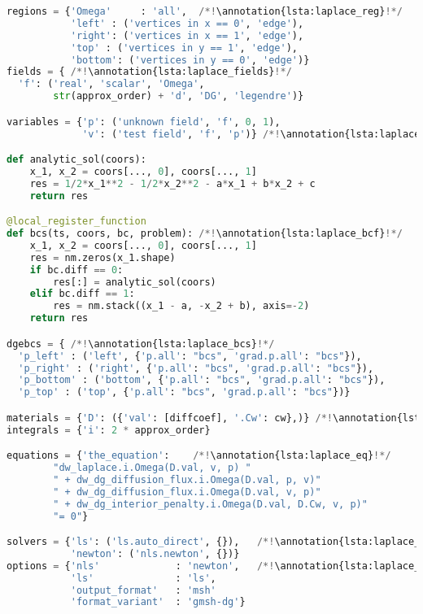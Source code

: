 \setcounter{lstannotation}{0}
\begin{lstlisting}[language=Python, caption=\pysauce{example\_dg\_laplace.py}, 
label={lst:laplace}]
regions = {'Omega'     : 'all',  /*!\annotation{lsta:laplace_reg}!*/
		   'left' : ('vertices in x == 0', 'edge'),
		   'right': ('vertices in x == 1', 'edge'),
		   'top' : ('vertices in y == 1', 'edge'),
		   'bottom': ('vertices in y == 0', 'edge')}
fields = { /*!\annotation{lsta:laplace_fields}!*/
  'f': ('real', 'scalar', 'Omega', 
        str(approx_order) + 'd', 'DG', 'legendre')}

variables = {'p': ('unknown field', 'f', 0, 1),
			 'v': ('test field', 'f', 'p')} /*!\annotation{lsta:laplace_vars}!*/

def analytic_sol(coors): 
	x_1, x_2 = coors[..., 0], coors[..., 1]
	res = 1/2*x_1**2 - 1/2*x_2**2 - a*x_1 + b*x_2 + c
	return res

@local_register_function
def bcs(ts, coors, bc, problem): /*!\annotation{lsta:laplace_bcf}!*/
	x_1, x_2 = coors[..., 0], coors[..., 1]
	res = nm.zeros(x_1.shape)
	if bc.diff == 0:
		res[:] = analytic_sol(coors)
	elif bc.diff == 1:
		res = nm.stack((x_1 - a, -x_2 + b), axis=-2)
	return res

dgebcs = { /*!\annotation{lsta:laplace_bcs}!*/
  'p_left' : ('left', {'p.all': "bcs", 'grad.p.all': "bcs"}),
  'p_right' : ('right', {'p.all': "bcs", 'grad.p.all': "bcs"}),
  'p_bottom' : ('bottom', {'p.all': "bcs", 'grad.p.all': "bcs"}),
  'p_top' : ('top', {'p.all': "bcs", 'grad.p.all': "bcs"})}

materials = {'D': ({'val': [diffcoef], '.Cw': cw},)} /*!\annotation{lsta:laplace_mat}!*/
integrals = {'i': 2 * approx_order}

equations = {'the_equation':    /*!\annotation{lsta:laplace_eq}!*/
		"dw_laplace.i.Omega(D.val, v, p) " 
	    " + dw_dg_diffusion_flux.i.Omega(D.val, p, v)" 
	    " + dw_dg_diffusion_flux.i.Omega(D.val, v, p)" 
	    " + dw_dg_interior_penalty.i.Omega(D.val, D.Cw, v, p)"
	    "= 0"}

solvers = {'ls': ('ls.auto_direct', {}),   /*!\annotation{lsta:laplace_solv}!*/
    	   'newton': ('nls.newton', {})}
options = {'nls'             : 'newton',   /*!\annotation{lsta:laplace_opts}!*/
	       'ls'              : 'ls',
		   'output_format'   : 'msh'
		   'format_variant'  : 'gmsh-dg'}
\end{lstlisting}


